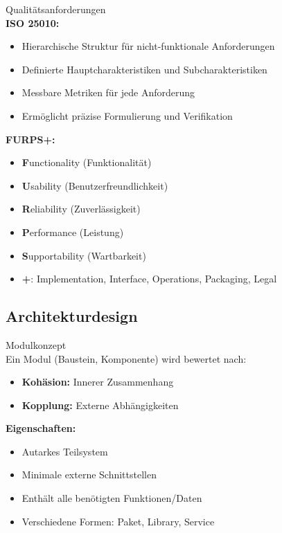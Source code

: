 \begin{theorem}{Qualitätsanforderungen}\\
\textbf{ISO 25010:}
\begin{itemize}
    \item Hierarchische Struktur für nicht-funktionale Anforderungen
    \item Definierte Hauptcharakteristiken und Subcharakteristiken
    \item Messbare Metriken für jede Anforderung
    \item Ermöglicht präzise Formulierung und Verifikation
\end{itemize}

\textbf{FURPS+:}
\begin{itemize}
    \item \textbf{F}unctionality (Funktionalität)
    \item \textbf{U}sability (Benutzerfreundlichkeit)
    \item \textbf{R}eliability (Zuverlässigkeit)
    \item \textbf{P}erformance (Leistung)
    \item \textbf{S}upportability (Wartbarkeit)
    \item \textbf{+}: Implementation, Interface, Operations, Packaging, Legal
\end{itemize}
\end{theorem}

\subsection{Architekturdesign}

\begin{concept}{Modulkonzept}\\
Ein Modul (Baustein, Komponente) wird bewertet nach:
\begin{itemize}
    \item \textbf{Kohäsion:} Innerer Zusammenhang
    \item \textbf{Kopplung:} Externe Abhängigkeiten
\end{itemize}

\textbf{Eigenschaften:}
\begin{itemize}
    \item Autarkes Teilsystem
    \item Minimale externe Schnittstellen
    \item Enthält alle benötigten Funktionen/Daten
    \item Verschiedene Formen: Paket, Library, Service
\end{itemize}
\end{concept}

